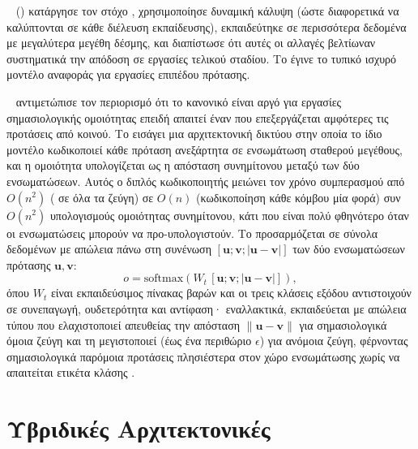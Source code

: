 \textbf{}~\cite{liu2019roberta} () κατάργησε τον στόχο , χρησιμοποίησε δυναμική κάλυψη (ώστε διαφορετικά
 να καλύπτονται σε κάθε διέλευση εκπαίδευσης), εκπαιδεύτηκε σε περισσότερα
δεδομένα με μεγαλύτερα μεγέθη δέσμης, και διαπίστωσε ότι αυτές οι αλλαγές βελτίωναν
συστηματικά την απόδοση σε εργασίες τελικού σταδίου.
Το  έγινε το τυπικό ισχυρό
μοντέλο αναφοράς για εργασίες  επιπέδου πρότασης.

\textbf{}~\cite{reimers2019sentence} αντιμετώπισε τον περιορισμό ότι το
κανονικό  είναι αργό για εργασίες σημασιολογικής ομοιότητας επειδή απαιτεί έναν
 που επεξεργάζεται αμφότερες τις προτάσεις από κοινού.
Το
 εισάγει μια αρχιτεκτονική  δικτύου στην οποία το ίδιο
μοντέλο  κωδικοποιεί κάθε πρόταση ανεξάρτητα σε ενσωμάτωση σταθερού μεγέθους,
και η ομοιότητα υπολογίζεται ως η απόσταση συνημίτονου μεταξύ των δύο ενσωματώσεων.
Αυτός ο διπλός κωδικοποιητής μειώνει τον χρόνο συμπερασμού από $O(n^2)$
( σε όλα τα ζεύγη) σε $O(n)$ (κωδικοποίηση κάθε κόμβου
μία φορά) συν $O(n^2)$ υπολογισμούς ομοιότητας συνημίτονου, κάτι που είναι πολύ
φθηνότερο όταν οι ενσωματώσεις μπορούν να προ-υπολογιστούν.
Το 
προσαρμόζεται σε σύνολα δεδομένων  με απώλεια
 πάνω στη συνένωση $[\mathbf{u}; \mathbf{v}; |\mathbf{u} - \mathbf{v}|]$
των δύο ενσωματώσεων πρότασης $\mathbf{u}, \mathbf{v}$:
\begin{equation}
    o = \mathrm{softmax}\!\left(W_t \, [\mathbf{u}; \mathbf{v}; |\mathbf{u} - \mathbf{v}|]\right),
    \label{eq:sbert-softmax}
\end{equation}
όπου $W_t$ είναι εκπαιδεύσιμος πίνακας βαρών και οι τρεις κλάσεις εξόδου αντιστοιχούν
σε συνεπαγωγή, ουδετερότητα και αντίφαση· εναλλακτικά, εκπαιδεύεται με απώλεια
τύπου  που ελαχιστοποιεί απευθείας την απόσταση
$\| \mathbf{u} - \mathbf{v} \|$ για σημασιολογικά όμοια ζεύγη και τη μεγιστοποιεί
(έως ένα περιθώριο $\epsilon$) για ανόμοια ζεύγη, φέρνοντας σημασιολογικά παρόμοια
προτάσεις πλησιέστερα στον χώρο ενσωμάτωσης χωρίς να απαιτείται ετικέτα κλάσης
.


\section{Υβριδικές Αρχιτεκτονικές}
\label{sec:hybrid-architectures}


